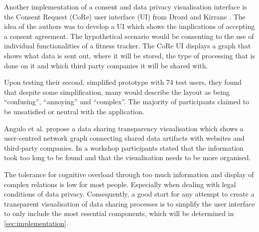 \documentclass[../paper.tex]{subfiles}
\begin{document}
  Another implementation of a consent and data privacy visualisation interface
  is the Consent Request (CoRe) user interface (UI) from Drozd and Kirrane
  \cite{cure2020}.  The idea of the authors was to develop a
  UI which shows the implications of accepting a consent agreement. The
  hypothetical scenario would be consenting to the use of individual
  functionalities of a fitness tracker. 
  The CoRe UI displays a
  graph that shows what data is sent out, where it will be stored, the type of
  processing that is done on it and which third party companies it will be
  shared with.

  Upon testing their second, simplified prototype with 74 test users, they 
  found that despite some simplification, many would describe the layout 
  as being “confusing”, “annoying” and “complex”. The majority of participants
  claimed to be unsatisfied or neutral with the application.
  
  Angulo et al. \cite{angulo_data_vis_tool_20} propose a data sharing transparency visualisation which
  shows a user-centred network graph connecting shared data artifacts with websites and third-party companies.
  In a workshop participants stated that the information took too long to be found and that the visualisation needs to be more organised.
  
  The tolerance for cognitive overload through too much information and display 
  of complex relations is low for most people. Especially when dealing with 
  legal conditions of data privacy. Consequently, a good start for any attempt
  to create a transparent visualisation of data sharing processes is to simplify
  the user interface to only include the most essential components, which will
  be determined in \cref{sec:implementation}.
\end{document}
